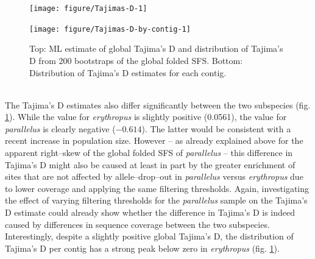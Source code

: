 \documentclass[a4paper,12pt,times,print,index,custombib,custommargin]{PhDThesisPSnPDF}\usepackage[]{graphicx}\usepackage[]{color}
\newenvironment{knitrout}{}{} %
\begin{document}
%
\begin{figure}[htb]
\centering
\begin{knitrout}
\color{fgcolor}

{\centering \texttt{[image: figure/Tajimas-D-1]} 

}



\end{knitrout}
\begin{knitrout}
\color{fgcolor}

{\centering \texttt{[image: figure/Tajimas-D-by-contig-1]} 

}



\end{knitrout}
\caption{Top: ML estimate of global Tajima's D and distribution of Tajima's D from 200 bootstraps of the global folded \gls{SFS}. Bottom: Distribution of Tajima's D estimates for each contig.}
\label{Fig:Tajimas-D}
\end{figure}
%
\\
The Tajima's D estimates also differ significantly between the two subspecies (fig. \ref{Fig:Tajimas-D}). While the value for \textit{erythropus} is slightly positive (0.0561), the value for \textit{parallelus} is clearly negative (\ensuremath{-0.614}). The latter would be consistent with a recent increase in population size. However -- as already explained above for the apparent right--skew of the global folded \gls{SFS} of \textit{parallelus} -- this difference in Tajima's D might also be caused at least in part by the greater enrichment of sites that are not affected by allele--drop--out in \textit{parallelus} versus \textit{erythropus} due to lower coverage and applying the same filtering thresholds. Again, investigating the effect of varying filtering thresholds for the \textit{parallelus} sample on the Tajima's D estimate could already show whether the difference in Tajima's D is indeed caused by differences in sequence coverage between the two subspecies. Interestingly, despite a slightly positive global Tajima's D, the distribution of Tajima's D per contig has a strong peak below zero in \textit{erythropus} (fig. \ref{Fig:Tajimas-D}). 






%
\end{document}

